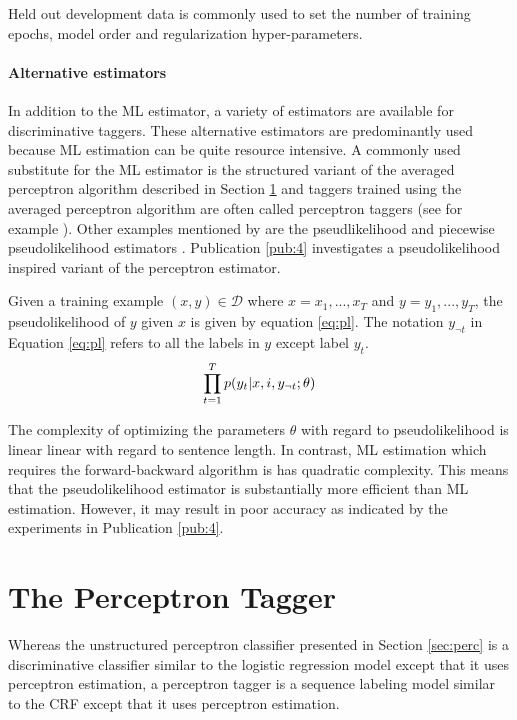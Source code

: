 Held out development data is commonly used to set the number of
training epochs, model order and regularization hyper-parameters.

\paragraph{Alternative estimators} In addition to the ML estimator, a
variety of estimators are available for discriminative taggers. These
alternative estimators are predominantly used because ML estimation
can be quite resource intensive. A commonly used substitute for the ML
estimator is the structured variant of the averaged perceptron
algorithm described in Section \ref{sec:prec-tagger} and taggers
trained using the averaged perceptron algorithm are often called
perceptron taggers (see for example \cite{Collins2002}). Other
examples mentioned by \cite{Sutton2012} are the pseudlikelihood
\cite{Besag1975} and piecewise pseudolikelihood estimators
\cite{Sutton2007}. Publication \ref{pub:4} investigates a
pseudolikelihood inspired variant of the perceptron estimator.

Given a training example $(x,y) \in \mathcal{D}$ where $x = x_1, ..., x_T$ and $y = y_1, ..., y_T$, the pseudolikelihood of $y$ given $x$ is given by equation \ref{eq:pl}. The notation $y_{\neg t}$ in Equation \ref{eq:pl} refers to all the labels in $y$ except label
$y_t$. 
\begin{equation}\label{eq:pl}\prod_{t = 1}^T p(y_t | x, i, y_{\neg t} \mbox{$ ; \, $} \theta)\end{equation}

The complexity of optimizing the parameters $\theta$ with regard to pseudolikelihood is linear linear with regard to sentence length. In contrast, ML estimation which requires the forward-backward algorithm is has quadratic complexity.
This means that the pseudolikelihood estimator is substantially more efficient than ML estimation. However, it
may result in poor accuracy as indicated by the experiments in Publication \ref{pub:4}.


\section{The Perceptron Tagger}
\label{sec:prec-tagger}

Whereas the unstructured perceptron classifier presented in Section
\ref{sec:perc} is a discriminative classifier similar to the logistic
regression model except that it uses perceptron estimation, a
perceptron tagger \citep{Collins2002} is a sequence labeling model
similar to the CRF except that it uses perceptron estimation.

